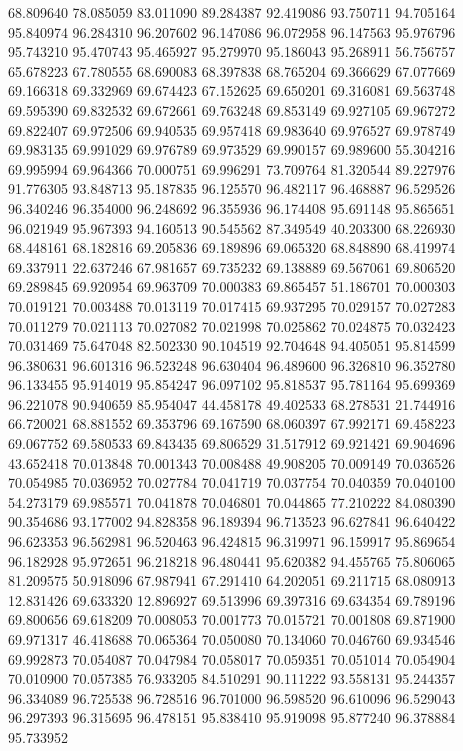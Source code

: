 68.809640
78.085059
83.011090
89.284387
92.419086
93.750711
94.705164
95.840974
96.284310
96.207602
96.147086
96.072958
96.147563
95.976796
95.743210
95.470743
95.465927
95.279970
95.186043
95.268911
56.756757
65.678223
67.780555
68.690083
68.397838
68.765204
69.366629
67.077669
69.166318
69.332969
69.674423
67.152625
69.650201
69.316081
69.563748
69.595390
69.832532
69.672661
69.763248
69.853149
69.927105
69.967272
69.822407
69.972506
69.940535
69.957418
69.983640
69.976527
69.978749
69.983135
69.991029
69.976789
69.973529
69.990157
69.989600
55.304216
69.995994
69.964366
70.000751
69.996291
73.709764
81.320544
89.227976
91.776305
93.848713
95.187835
96.125570
96.482117
96.468887
96.529526
96.340246
96.354000
96.248692
96.355936
96.174408
95.691148
95.865651
96.021949
95.967393
94.160513
90.545562
87.349549
40.203300
68.226930
68.448161
68.182816
69.205836
69.189896
69.065320
68.848890
68.419974
69.337911
22.637246
67.981657
69.735232
69.138889
69.567061
69.806520
69.289845
69.920954
69.963709
70.000383
69.865457
51.186701
70.000303
70.019121
70.003488
70.013119
70.017415
69.937295
70.029157
70.027283
70.011279
70.021113
70.027082
70.021998
70.025862
70.024875
70.032423
70.031469
75.647048
82.502330
90.104519
92.704648
94.405051
95.814599
96.380631
96.601316
96.523248
96.630404
96.489600
96.326810
96.352780
96.133455
95.914019
95.854247
96.097102
95.818537
95.781164
95.699369
96.221078
90.940659
85.954047
44.458178
49.402533
68.278531
21.744916
66.720021
68.881552
69.353796
69.167590
68.060397
67.992171
69.458223
69.067752
69.580533
69.843435
69.806529
31.517912
69.921421
69.904696
43.652418
70.013848
70.001343
70.008488
49.908205
70.009149
70.036526
70.054985
70.036952
70.027784
70.041719
70.037754
70.040359
70.040100
54.273179
69.985571
70.041878
70.046801
70.044865
77.210222
84.080390
90.354686
93.177002
94.828358
96.189394
96.713523
96.627841
96.640422
96.623353
96.562981
96.520463
96.424815
96.319971
96.159917
95.869654
96.182928
95.972651
96.218218
96.480441
95.620382
94.455765
75.806065
81.209575
50.918096
67.987941
67.291410
64.202051
69.211715
68.080913
12.831426
69.633320
12.896927
69.513996
69.397316
69.634354
69.789196
69.800656
69.618209
70.008053
70.001773
70.015721
70.001808
69.871900
69.971317
46.418688
70.065364
70.050080
70.134060
70.046760
69.934546
69.992873
70.054087
70.047984
70.058017
70.059351
70.051014
70.054904
70.010900
70.057385
76.933205
84.510291
90.111222
93.558131
95.244357
96.334089
96.725538
96.728516
96.701000
96.598520
96.610096
96.529043
96.297393
96.315695
96.478151
95.838410
95.919098
95.877240
96.378884
95.733952
